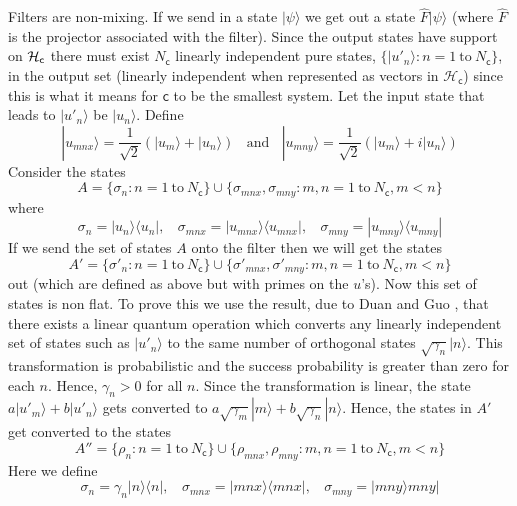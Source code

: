 \documentclass[10pt]{article}
\begin{document}
Filters are non-mixing.  If we send in a state $|\psi\rangle$ we get out a state $\hat F|\psi\rangle$ (where $\hat F$ is the projector associated with the filter). Since the output states have support on ${\cal H}_\mathsf{c}$ there must exist $N_\mathsf{c}$ linearly independent pure states, $\{|u'_n\rangle: n=1~\text{to}~ N_\mathsf{c}\}$, in the output set (linearly independent when represented as vectors in $\mathcal H_{\mathsf{c}}$) since this is what it means for $\mathsf c$ to be the smallest system. Let the input state that leads to $|u'_n\rangle$ be $|u_n\rangle$.  Define
\begin{equation}
|u_{mnx}\rangle=\frac{1}{\sqrt{2}} (|u_m\rangle+|u_n\rangle)~~~~\text{and}~~~~ |u_{mny}\rangle=\frac{1}{\sqrt{2}} (|u_m\rangle+i|u_n\rangle)
\end{equation}
Consider the states
\begin{equation}
A=\{\sigma_n: n=1~\text{to}~N_\mathsf{c} \}\cup\{\sigma_{mnx},\sigma_{mny}: m,n=1~\text{to}~N_\mathsf{c}, m<n\}
\end{equation}
where
\begin{equation}
\sigma_n=|u_n\rangle\langle u_n|, ~~~~\sigma_{mnx}=|u_{mnx}\rangle\langle u_{mnx}|, ~~~~\sigma_{mny}=|u_{mny}\rangle\langle u_{mny}|
\end{equation}
If we send the set of states $A$ onto the filter then we will get the states
\begin{equation}
A'=\{\sigma'_n: n=1~\text{to}~N_\mathsf{c} \}\cup\{\sigma'_{mnx},\sigma'_{mny}: m,n=1~\text{to}~N_\mathsf{c}, m<n\}
\end{equation}
out (which are defined as above but with primes on the $u$'s).  Now this set of states is non flat.  To prove this we use the result, due to Duan and Guo \cite{duan1998probabilistic}, that there exists a linear quantum operation which converts any linearly independent set of states such as $|u'_n\rangle$ to the same number of orthogonal states $\sqrt{\gamma_n}|n\rangle$.  This transformation is probabilistic and the success probability is greater than zero for each $n$. Hence, $\gamma_n>0$ for all $n$.  Since the transformation is linear, the state $a|u'_m\rangle+b|u'_n\rangle$ gets converted to $a\sqrt{\gamma_m}|m\rangle + b\sqrt{\gamma_n}|n\rangle$.  Hence, the states in $A'$ get converted to the states
\begin{equation}
A''=\{\rho_n: n=1~\text{to}~N_\mathsf{c} \}\cup\{\rho_{mnx},\rho_{mny}: m,n=1~\text{to}~N_\mathsf{c}, m<n\}
\end{equation}
Here we define
\begin{equation}
\sigma_n=\gamma_n|n\rangle\langle n|, ~~~~\sigma_{mnx}=|{mnx}\rangle\langle {mnx}|, ~~~~\sigma_{mny}=|{mny}\rangle {mny}|
\end{equation}
\end{document}
